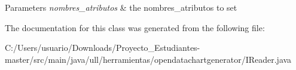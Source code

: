 \begin{DoxyParams}{Parameters}
{\em nombres\+\_\+atributos} & the nombres\+\_\+atributos to set \\
\hline
\end{DoxyParams}


The documentation for this class was generated from the following file\+:\begin{DoxyCompactItemize}
\item 
C\+:/\+Users/usuario/\+Downloads/\+Proyecto\+\_\+\+Estudiantes-\/master/src/main/java/ull/herramientas/opendatachartgenerator/I\+Reader.\+java\end{DoxyCompactItemize}
